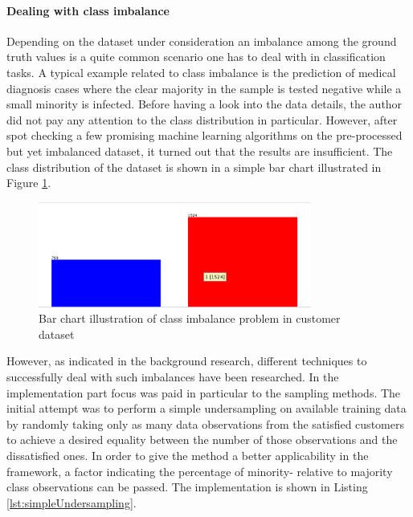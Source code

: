 \paragraph{Dealing with class imbalance}
Depending on the dataset under consideration an imbalance among the ground truth values is a quite common scenario one has to deal with in classification tasks. A typical example related to class imbalance is the prediction of medical diagnosis cases where the clear majority in the sample is tested negative while a small minority is infected. Before having a look into the data details, the author did not pay any attention to the class distribution in particular. However, after spot checking a few promising machine learning algorithms on the pre-processed but yet imbalanced dataset, it turned out that the results are insufficient. The class distribution of the dataset is shown in a simple bar chart illustrated in Figure \ref{fig:classDistribution}. 

\begin{figure}
	\centering
	\includegraphics[width=0.8\textwidth]{img/classImbalance.png}
	\caption{Bar chart illustration of class imbalance problem in customer dataset}
	\label{fig:classDistribution}
\end{figure} 

However, as indicated in the background research, different techniques to successfully deal with such imbalances have been researched. In the implementation part focus was paid in particular to the sampling methods. The initial attempt was to perform a simple undersampling on available training data by randomly taking only as many data observations from the satisfied customers to achieve a desired equality between the number of those observations and the dissatisfied ones. In order to give the method a better applicability in the framework, a factor indicating the percentage of minority- relative to majority class observations can be passed. The implementation is shown in Listing \ref{lst:simpleUndersampling}. 

